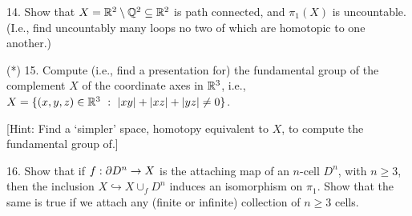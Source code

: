 \documentclass[12pt]{article}
\begin{document}
\begin{description}
\msk

\item{14.}  Show that $X={\mathbb R}^2\setminus{\mathbb Q}^2\subseteq {\mathbb R}^2$ is path connected,
and $\pi_1(X)$ is uncountable. (I.e., find uncountably many loops no two of which are
homotopic to one another.)

\msk

\item{(*)} 15. Compute (i.e., find a presentation for) the fundamental group of the 
complement $X$ of the coordinate 
axes in ${\mathbb R}^3$, i.e., $X=\{(x,y,z)\in \bbr^3\ :\ |xy|+|xz|+|yz|\neq 0\}$. 

\ssk

\item{\spc} [Hint: Find a `simpler' space, homotopy equivalent to $X$, to compute the fundamental group of.]

\msk

\item{16.} Show that if $f:\partial D^n\rightarrow X$ is the attaching map of an $n$-cell
$D^n$, with $n\geq 3$, then the inclusion $X\hookrightarrow X\cup_f D^n$ induces
an isomorphism on $\pi_1$. Show that the same is true if we attach any
(finite or infinite) collection of $n\geq 3$ cells. 

\msk

\end{description}
\vfill
\end{document}

